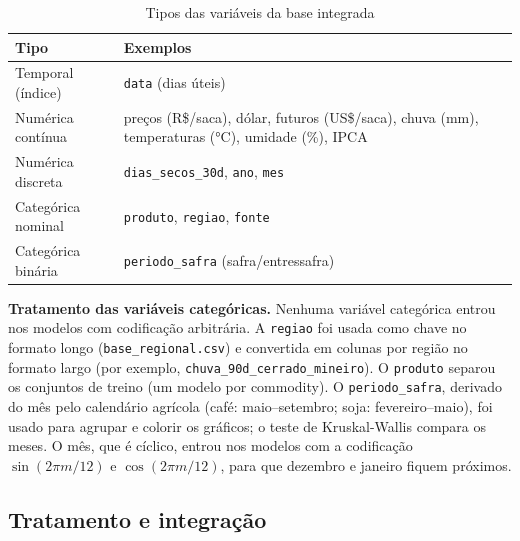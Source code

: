 \documentclass[conference]{IEEEtran}
\begin{document}
\begin{table}[!tb]
\centering
\caption{Tipos das variáveis da base integrada}
\label{tab:tipos}
\small
\begin{tabular}{@{}L{2.7cm}L{5.2cm}@{}}
\toprule
Tipo & Exemplos \\
\midrule
Temporal (índice) & \texttt{data} (dias úteis) \\
Numérica contínua & preços (R\$/saca), dólar, futuros (US\$/saca), chuva (mm), temperaturas (°C), umidade (\%), IPCA \\
Numérica discreta & \texttt{dias\_secos\_30d}, \texttt{ano}, \texttt{mes} \\
Categórica nominal & \texttt{produto}, \texttt{regiao}, \texttt{fonte} \\
Categórica binária & \texttt{periodo\_safra} (safra/entressafra) \\
\bottomrule
\end{tabular}
\end{table}

\textbf{Tratamento das variáveis categóricas.} Nenhuma variável categórica entrou nos modelos com
codificação arbitrária. A \texttt{regiao} foi usada como chave no formato longo
(\texttt{base\_regional.csv}) e convertida em colunas por região no formato largo (por exemplo,
\texttt{chuva\_90d\_cerrado\_mineiro}). O \texttt{produto} separou os conjuntos de treino (um modelo por
commodity). O \texttt{periodo\_safra}, derivado do mês pelo calendário agrícola (café: maio--setembro;
soja: fevereiro--maio), foi usado para agrupar e colorir os gráficos; o teste de Kruskal-Wallis compara os meses. O mês,
que é cíclico, entrou nos modelos com a codificação $\sin(2\pi m/12)$ e $\cos(2\pi m/12)$, para que
dezembro e janeiro fiquem próximos.

\subsection{Tratamento e integração}
\end{document}
